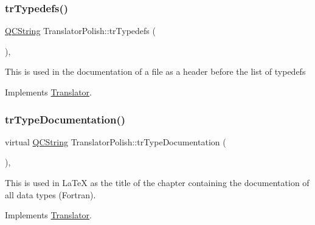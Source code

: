 \mbox{\label{class_translator_polish_a64493b275b4674d073ab5b617c83d9df}} 
\subsubsection{\texorpdfstring{trTypedefs()}{trTypedefs()}}
{\footnotesize\ttfamily \mbox{\hyperlink{class_q_c_string}{Q\+C\+String}} Translator\+Polish\+::tr\+Typedefs (\begin{DoxyParamCaption}{ }\end{DoxyParamCaption})\hspace{0.3cm}{\ttfamily [inline]}, {\ttfamily [virtual]}}

This is used in the documentation of a file as a header before the list of typedefs 

Implements \mbox{\hyperlink{class_translator}{Translator}}.

\mbox{\label{class_translator_polish_a73f10fc0ab8af5031abfcb258f040175}} 
\subsubsection{\texorpdfstring{trTypeDocumentation()}{trTypeDocumentation()}}
{\footnotesize\ttfamily virtual \mbox{\hyperlink{class_q_c_string}{Q\+C\+String}} Translator\+Polish\+::tr\+Type\+Documentation (\begin{DoxyParamCaption}{ }\end{DoxyParamCaption})\hspace{0.3cm}{\ttfamily [inline]}, {\ttfamily [virtual]}}

This is used in La\+TeX as the title of the chapter containing the documentation of all data types (Fortran). 

Implements \mbox{\hyperlink{class_translator}{Translator}}.

\mbox{\label{class_translator_polish_ae02bdc7d806b48abbc262905706d8b29}} 
